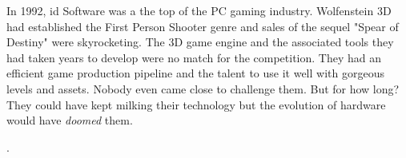 In 1992, id Software was a the top of the PC gaming industry. Wolfenstein 3D had established the First
Person Shooter genre and sales of the sequel "Spear of Destiny" were skyrocketing. The 3D game engine and the associated 
tools they had taken years to develop were no match for the competition. They had an efficient game production pipeline and the talent to use it well with gorgeous levels and assets. Nobody even came close to challenge them. But for how long? They could have kept milking their technology but the evolution of hardware would have \textit{doomed} them.\\
\par

\par
{}. \\
\par


